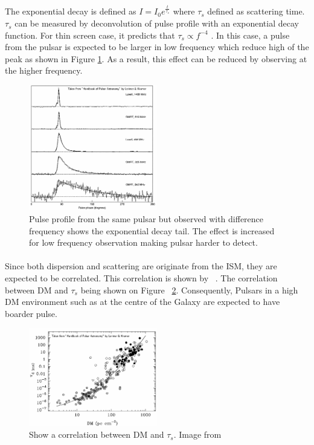 \documentclass[thesis_msc.tex]{subfiles}
\begin{document}
The exponential decay is defined as $I=I_0 e^{\frac{t}{\tau_s}}$ where $\tau_s$ defined as scattering time. $\tau_s$ can be measured by deconvolution of pulse profile with an exponential decay function. For thin screen case, it predicts that $\tau_s \propto f^{-4}$ \citep{xu2017scatter}. In this case, a pulse from the pulsar is expected to be larger in low frequency which reduce high of the peak as shown in Figure \ref{pscatt}. As a result, this effect can be reduced by observing at the higher frequency.

    \begin{figure}[h] \centering 
\includegraphics[width=0.5\textwidth]{figures/pulsescat.png}
\caption{Pulse profile from the same pulsar but observed with difference frequency shows the exponential decay tail. The effect is increased for low frequency observation making pulsar harder to detect. \citep{handbook}  }
\label{pscatt}
\end{figure}

\paragraph{} Since both dispersion and scattering are originate from the ISM, they are expected to be correlated. This correlation is shown by ~\cite{Bhat:2004xt}. The correlation between DM and $\tau_s$ being shown on Figure ~\ref{t_dm}. Consequently, Pulsars in a high DM environment such as at the centre of the Galaxy are expected to have boarder pulse.  

    \begin{figure}[h] \centering
\includegraphics[width=0.5\textwidth]{figures/t_dm.png}
\caption{Show a correlation between DM and $\tau_s$. Image from \citep{handbook}  }
\label{t_dm}
\end{figure}
\end{document}
